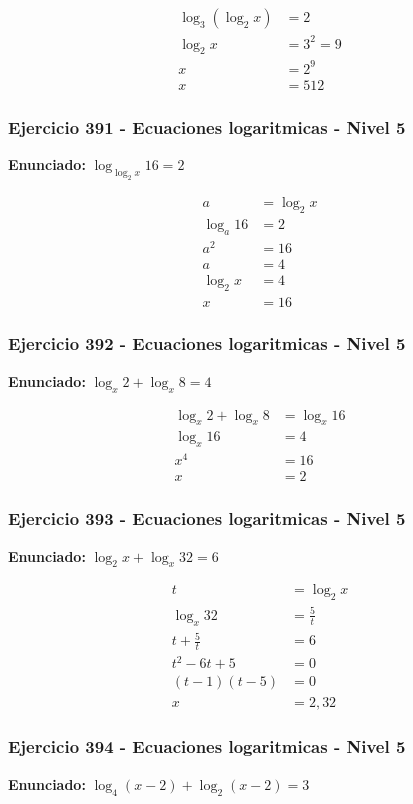 \documentclass[12pt,a4paper]{article}
\begin{document}
\[
\begin{aligned}
\log_3(\log_2x)&=2\\
\log_2x&=3^2=9\\
x&=2^9\\
x&=\boxed{512}
\end{aligned}
\]


\subsubsection*{Ejercicio 391 - Ecuaciones logaritmicas - Nivel 5}
\textbf{Enunciado:} \(\log_{\log_2 x}16=2\)

\[
\begin{aligned}
a&=\log_2x\\
\log_a16&=2\\
a^2&=16\\
a&=4\\
\log_2x&=4\\
x&=\boxed{16}
\end{aligned}
\]


\subsubsection*{Ejercicio 392 - Ecuaciones logaritmicas - Nivel 5}
\textbf{Enunciado:} \(\log_x2+\log_x8=4\)

\[
\begin{aligned}
\log_x2+\log_x8&=\log_x16\\
\log_x16&=4\\
x^4&=16\\
x&=\boxed{2}
\end{aligned}
\]


\subsubsection*{Ejercicio 393 - Ecuaciones logaritmicas - Nivel 5}
\textbf{Enunciado:} \(\log_2x+\log_x32=6\)

\[
\begin{aligned}
t&=\log_2x\\
\log_x32&=\frac5t\\
t+\frac5t&=6\\
t^2-6t+5&=0\\
(t-1)(t-5)&=0\\
x&=\boxed{2,32}
\end{aligned}
\]


\subsubsection*{Ejercicio 394 - Ecuaciones logaritmicas - Nivel 5}
\textbf{Enunciado:} \(\log_4(x-2)+\log_2(x-2)=3\)
\end{document}
